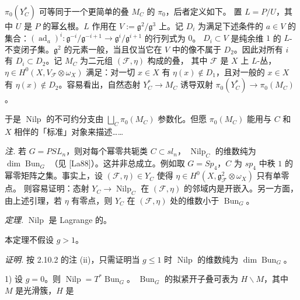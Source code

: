 $\pi_0(Y_C^*)$ 可等同于一个更简单的叠 $M_C$ 的 $\pi_0$，后者定义如下。
置 $L=P/U$，其中 $U$ 是 $P$ 的幂幺根。$L$ 作用在
$V:=\mathfrak{g}^2/\mathfrak{g}^3$ 上。记 $D_i$ 为满足下述条件的
$a\in V$ 的集合：$(\operatorname{ad}_a)^i:
\mathfrak{g}^{-i}/\mathfrak{g}^{-i+1}\to
\mathfrak{g}^i/\mathfrak{g}^{i+1}$ 的行列式为 $0$。
$D_i\subset V$ 是纯余维 $1$ 的 $L$-不变闭子集。$\mathfrak{g}^2$
的元素一般，当且仅当它在 $V$ 中的像不属于 $D_2$。因此对所有 $i$ 有
$D_i\subset D_2$。记 $M_C$ 为二元组 $(\mathcal{F},\eta)$ 构成的叠，
其中 $\mathcal{F}$ 是 $X$ 上 $L$-丛，
$\eta\in H^0(X,V_{\mathcal{F}}\otimes\omega_X)$ 满足：对一切
$x\in X$ 有 $\eta(x)\notin D_1$，且对一般的 $x\in X$ 有
$\eta(x)\notin D_2$。容易看出，自然态射 $Y_C^*\to M_C$ 诱导双射
$\pi_0(Y_C^*)\to\pi_0(M_C)$。

于是 $\operatorname{Nilp}$ 的不可约分支由
$\bigsqcup_C\pi_0(M_C)$ 参数化。但愿 $\pi_0(M_C)$ 能用与 $C$ 和
$X$ 相伴的「标准」对象来描述……

\emph{注.} 若 $G=PSL_n$，则对每个幂零共轭类 $C\subset sl_n$，
$\operatorname{Nilp}_C$ 的维数纯为 $\dim\operatorname{Bun}_G$
（见 [La88]）。这并非总成立。例如取 $G=Sp_4$，$C$ 为 $sp_4$ 中秩
$1$ 的幂零矩阵之集。事实上，设 $(\mathcal{F},\eta)\in Y_C$ 使得
$\eta\in H^0(X,\mathfrak{g}^2_{\mathcal{F}}\otimes\omega_X)$ 只有单零点。
则容易证明：态射 $Y_C\to\operatorname{Nilp}_C$ 在
$(\mathcal{F},\eta)$ 的邻域内是开嵌入。另一方面，由上述引理，若
$\eta$ 有零点，则 $Y_C$ 在 $(\mathcal{F},\eta)$ 处的维数小于
$\operatorname{Bun}_G$。

 \emph{定理.} $\operatorname{Nilp}$ 是 Lagrange 的。

本定理不假设 $g>1$。

\emph{证明.} 按 2.10.2 的注 (ii)，只需证明当 $g\le 1$ 时
$\operatorname{Nilp}$ 的维数纯为 $\dim\operatorname{Bun}_G$。

1) 设 $g=0$。则 $\operatorname{Nilp}=T^{*}\operatorname{Bun}_G$。
$\operatorname{Bun}_G$ 的拟紧开子叠可表为 $H\backslash M$，其中 $M$
是光滑簇，$H$ 是
